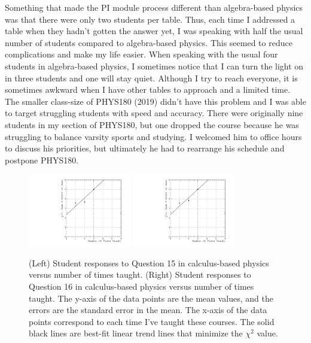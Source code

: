 \documentclass[../../main.tex]{subfiles}
\begin{document}
Something that made the PI module process different than algebra-based physics was that there were only two students per table.  Thus, each time I addressed a table when they hadn't gotten the answer yet, I was speaking with half the usual number of students compared to algebra-based physics.  This seemed to reduce complications and make my life easier.  When speaking with the usual four students in algebra-based physics, I sometimes notice that I can turn the light on in three students and one will stay quiet.  Although I try to reach everyone, it is sometimes awkward when I have other tables to approach and a limited time.  The smaller class-size of PHYS180 (2019) didn't have this problem and I was able to target struggling students with speed and accuracy.  There were originally nine students in my section of PHYS180, but one dropped the course because he was struggling to balance varsity sports and studying.  I welcomed him to office hours to discuss his priorities, but ultimately he had to rearrange his schedule and postpone PHYS180. \\ \hspace{0.1cm}

\begin{figure}
\centering
\includegraphics[width=0.4\textwidth]{Q15_calculus_based.pdf}
\includegraphics[width=0.4\textwidth]{Q16_calculus_based.pdf}
\caption{\label{fig:courses:intro_q15_2}  (Left) Student responses to Question 15 in calculus-based physics versus number of times taught. (Right) Student responses to Question 16 in calculus-based physics versus number of times taught.  The y-axis of the data points are the mean values, and the errors are the standard error in the mean.  The x-axis of the data points correspond to each time I've taught these courses.  The solid black lines are best-fit linear trend lines that minimize the $\chi^2$ value.}
\end{figure}
\end{document}
